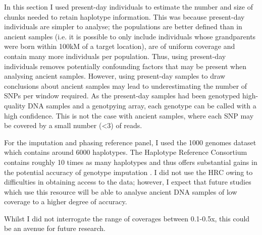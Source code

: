 In this section I used present-day individuals to estimate the number and size of chunks needed to retain haplotype information. This was because present-day individuals are simpler to analyse; the populations are better defined than in ancient samples (i.e. it is possible to only include individuals whose grandparents were born within 100kM of a target location), are of uniform coverage and contain many more individuals per population. Thus, using present-day individuals removes potentially confounding factors that may be present when analysing ancient samples. However, using present-day samples to draw conclusions about ancient samples may lead to underestimating the number of SNPs per window required. As the present-day samples had been genotyped high-quality DNA samples and a genotpying array, each genotype can be called with a high confidence. This is not the case with ancient samples, where each SNP may be covered by a small number (<3) of reads.

For the imputation and phasing reference panel, I used the 1000 genomes dataset which contains around 6000 haplotypes. The Haplotype Reference Consortium contains roughly 10 times as many haplotypes and thus offers substantial gains in the potential accuracy of genotype imputation \cite{rubinacci2021efficient}. I did not use the HRC owing to difficulties in obtaining access to the data; however, I expect that future studies which use this resource will be able to analyse ancient DNA samples of low coverage to a higher degree of accuracy. 

Whilst I did not interrogate the range of coverages between 0.1-0.5x, this could be an avenue for future research.



